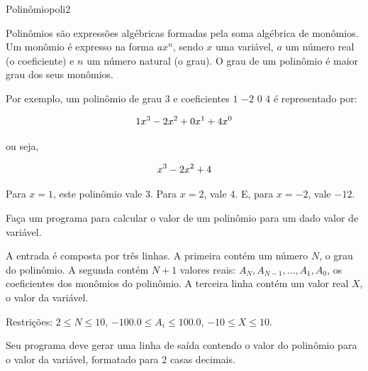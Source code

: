 \documentclass[12pt,a4paper,oneside]{article}
\begin{document}
\begin{problem}{Polinômio}{poli}{2}
 
Polinômios são expressões algébricas formadas pela soma algébrica de monômios. Um monômio é expresso na forma $ax^n$, sendo $x$  uma variável, $a$ um número real (o coeficiente) e $n$ um número natural (o grau). O grau de um polinômio é maior grau dos seus monômios.

Por exemplo, um polinômio de grau $3$ e coeficientes $1$ $-2$ $0$ $4$ é representado por:

\begin{equation}
1x^3 - 2x^2 + 0x^1 + 4x^0\notag
\end{equation}

ou seja,

\begin{equation}
x^3 - 2x^2 + 4\notag
\end{equation}

Para $x=1$, este polinômio vale $3$. Para $x=2$, vale $4$. E, para $x=-2$, vale $-12$.

Faça um programa para calcular o valor de um polinômio para um dado valor de variável.

%

\InputFile

A entrada é composta por três linhas. A primeira contém um número $N$, o grau do polinômio. A segunda contém $N+1$ valores reais: $A_N, A_{N-1}, \dots, A_1, A_0$, os coeficientes dos monômios do polinômio. A terceira linha contém um valor real $X$, o valor da variável.

Restrições: $2 \leq N \leq 10$, $-100.0 \leq A_i \leq 100.0$, $-10 \leq X \leq 10$.

\OutputFile

Seu programa deve gerar uma linha de saída contendo o valor do polinômio para o valor da variável, formatado para 2 casas decimais.


\Example

\begin{example}
%
\end{example}

\begin{example}
%
\end{example}


\end{problem}
\end{document}
